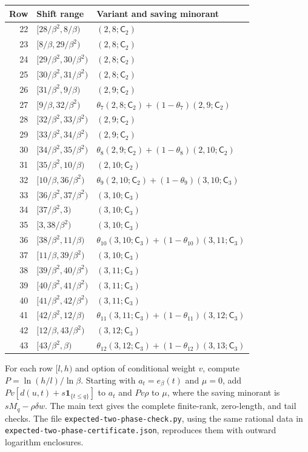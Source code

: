 \begin{center}\small
\begin{tabular}{rll}
\hline Row&Shift range&Variant and saving minorant\\\hline
22&$[28/\beta^2,8/\beta)$&$(2,8;\mathsf C_{2})$\\
23&$[8/\beta,29/\beta^2)$&$(2,8;\mathsf C_{2})$\\
24&$[29/\beta^2,30/\beta^2)$&$(2,8;\mathsf C_{2})$\\
25&$[30/\beta^2,31/\beta^2)$&$(2,8;\mathsf C_{2})$\\
26&$[31/\beta^2,9/\beta)$&$(2,9;\mathsf C_{2})$\\
27&$[9/\beta,32/\beta^2)$&$\theta_{7}(2,8;\mathsf C_{2})+(1-\theta_{7})(2,9;\mathsf C_{2})$\\
28&$[32/\beta^2,33/\beta^2)$&$(2,9;\mathsf C_{2})$\\
29&$[33/\beta^2,34/\beta^2)$&$(2,9;\mathsf C_{2})$\\
30&$[34/\beta^2,35/\beta^2)$&$\theta_{8}(2,9;\mathsf C_{2})+(1-\theta_{8})(2,10;\mathsf C_{2})$\\
31&$[35/\beta^2,10/\beta)$&$(2,10;\mathsf C_{2})$\\
32&$[10/\beta,36/\beta^2)$&$\theta_{9}(2,10;\mathsf C_{2})+(1-\theta_{9})(3,10;\mathsf C_{3})$\\
33&$[36/\beta^2,37/\beta^2)$&$(3,10;\mathsf C_{3})$\\
34&$[37/\beta^2,3)$&$(3,10;\mathsf C_{3})$\\
35&$[3,38/\beta^2)$&$(3,10;\mathsf C_{3})$\\
36&$[38/\beta^2,11/\beta)$&$\theta_{10}(3,10;\mathsf C_{3})+(1-\theta_{10})(3,11;\mathsf C_{3})$\\
37&$[11/\beta,39/\beta^2)$&$(3,10;\mathsf C_{3})$\\
38&$[39/\beta^2,40/\beta^2)$&$(3,11;\mathsf C_{3})$\\
39&$[40/\beta^2,41/\beta^2)$&$(3,11;\mathsf C_{3})$\\
40&$[41/\beta^2,42/\beta^2)$&$(3,11;\mathsf C_{3})$\\
41&$[42/\beta^2,12/\beta)$&$\theta_{11}(3,11;\mathsf C_{3})+(1-\theta_{11})(3,12;\mathsf C_{3})$\\
42&$[12/\beta,43/\beta^2)$&$(3,12;\mathsf C_{3})$\\
43&$[43/\beta^2,\beta)$&$\theta_{12}(3,12;\mathsf C_{3})+(1-\theta_{12})(3,13;\mathsf C_{3})$\\
\hline\end{tabular}\end{center}

For each row $[l,h)$ and option of conditional weight $v$, compute
$P=\ln(h/l)/\ln\beta$. Starting with $a_t=e_\beta(t)$ and $\mu=0$,
add $Pv[d(u,t)+s\mathbf1_{\{t\le q\}}]$ to $a_t$ and
$Pv\rho$ to $\mu$, where the saving minorant is
$sM_q-\rho\delta w$. The main text gives the complete finite-rank,
zero-length, and tail checks. The file
\texttt{expected-two-phase-}\allowbreak\texttt{check.py}, using the same rational data in
\texttt{expected-two-phase-}\allowbreak\texttt{certificate.json}, reproduces them with
outward logarithm enclosures.
